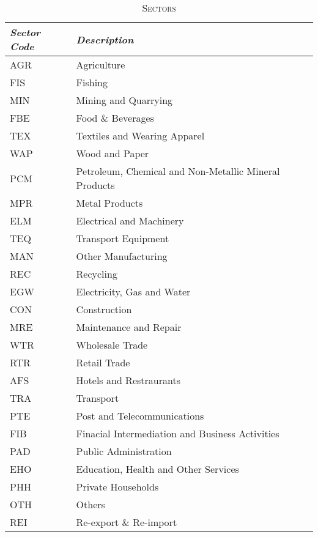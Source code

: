 \documentclass[a4paper]{article}
\begin{document}
\begin{table}[h!]
\centering
\caption{\textsc{Sectors}}

\label{tab:sec}
\vspace{2mm}
\begin{tabular}{ll} \toprule
\textit{Sector Code} & \textit{Description} \\ \midrule
AGR & Agriculture \\
 FIS & Fishing \\
 MIN & Mining and Quarrying \\
 FBE & Food \& Beverages \\
 TEX & Textiles and Wearing Apparel \\
 WAP & Wood and Paper \\
 PCM & Petroleum, Chemical and Non-Metallic Mineral Products \\
 MPR & Metal Products \\
 ELM & Electrical and Machinery \\
 TEQ & Transport Equipment \\
 MAN & Other Manufacturing \\
 REC & Recycling \\
 EGW & Electricity, Gas and Water \\
 CON & Construction \\
 MRE & Maintenance and Repair \\
 WTR & Wholesale Trade \\
 RTR & Retail Trade \\
 AFS & Hotels and Restraurants \\
 TRA & Transport \\
 PTE & Post and Telecommunications \\
 FIB & Finacial Intermediation and Business Activities \\
 PAD & Public Administration \\
 EHO & Education, Health and Other Services \\
 PHH & Private Households \\
 OTH & Others \\
 REI & Re-export \& Re-import \\ \bottomrule
\end{tabular}
\end{table}
\FloatBarrier
\end{document}
